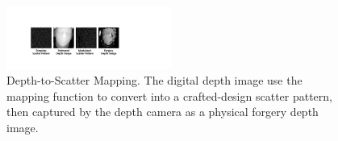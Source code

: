 


\begin{figure}[!t]
	\centering
	\includegraphics[width=0.48\textwidth]{figures/depth_mapping_1.pdf} 
	\vspace{-0.15in}
	\caption{Depth-to-Scatter Mapping. The digital depth image use the mapping function to convert into a crafted-design scatter pattern, then captured by the depth camera as a physical forgery depth image.}
	\label{depth_mapping}
	\vspace{-0.15in}
\end{figure}


